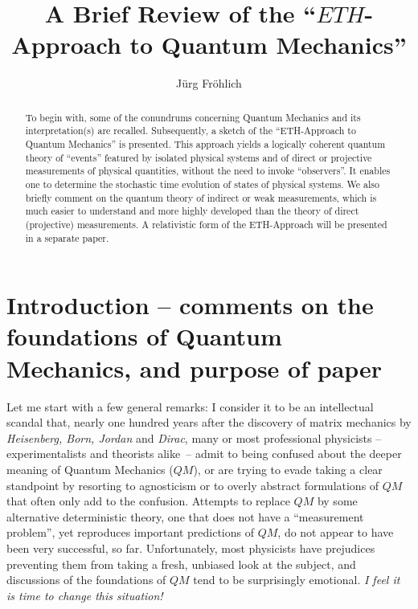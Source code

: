 \documentclass[12pt]{article}
\author{J\"{u}rg Fr\"{o}hlich}
\title{A Brief Review of the ``$\textit{ETH}$- Approach to Quantum Mechanics''}
\begin{document}
\maketitle

\begin{abstract}
To begin with, some of the conundrums concerning Quantum Mechanics and its interpretation(s) are recalled. Subsequently, a sketch of the ``ETH-Approach to Quantum Mechanics'' is presented. This approach yields a logically coherent quantum theory of ``events'' featured by isolated physical systems and of direct or projective measurements of physical quantities, without the need to invoke ``observers''. It enables one to determine the stochastic time evolution of states of physical systems. 
We also briefly comment on the quantum theory of indirect or weak measurements, which is much easier to understand and more highly developed than the theory of direct (projective) measurements. 
A relativistic form of the ETH-Approach will be presented in a separate paper. 
\end{abstract}

\newpage
\tableofcontents
\newpage

\section{Introduction -- comments on the foundations of Quantum Mechanics, and purpose of paper}\label{Intro}


Let me start with a few general remarks: I consider it to be an intellectual scandal that, nearly one hundred years after the discovery of matrix mechanics by \textit{Heisenberg, Born, Jordan} and \textit{Dirac}, many or most professional physicists -- experimentalists and theorists \mbox{alike --} admit to being confused about the deeper meaning of Quantum Mechanics ($QM$), or are trying to evade taking a clear standpoint by resorting to agnosticism or to overly abstract formulations of $QM$ that often only add to the confusion. Attempts to replace $QM$ by some alternative deterministic theory, one that does not have a ``measurement problem'', yet reproduces important predictions of $QM$, do not appear to have been very successful, so far. Unfortunately, most physicists have prejudices preventing them from taking a fresh, unbiased look at the subject, and discussions of the foundations of $QM$ tend to be surprisingly emotional. \textit{I feel it is time to change this situation!}
\end{document}
